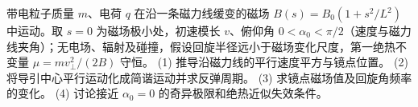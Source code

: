 带电粒子质量 \(m\)、电荷 \(q\) 在沿一条磁力线缓变的磁场 \(B(s)=B_0(1+s^2/L^2)\) 中运动。取 \(s=0\) 为磁场极小处，初速模长 \(v\)、俯仰角 \(0<\alpha_0<\pi/2\)（速度与磁力线夹角）；无电场、辐射及碰撞，假设回旋半径远小于磁场变化尺度，第一绝热不变量 \(\mu=mv_\perp^2/(2B)\) 守恒。
(1) 推导沿磁力线的平行速度平方与镜点位置。
(2) 将导引中心平行运动化成简谐运动并求反弹周期。
(3) 求镜点磁场值及回旋角频率的变化。
(4) 讨论接近 \(\alpha_0=0\) 的奇异极限和绝热近似失效条件。
